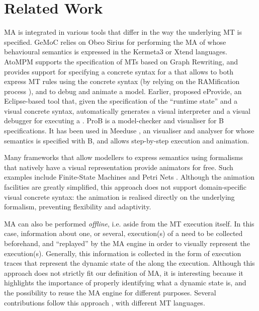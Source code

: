 \section{Related Work}
\label{sec:RW}

MA is integrated in various tools that differ in the way the underlying MT is specified.
GeMoC \citep{combemale2016tool} relies on Obeo Sirius for performing the MA of 
\DSLs whose behavioural semantics is expressed in the Kermeta3 or Xtend languages.
AtoMPM \cite{Syriani-Vangheluwe-etAl:2013} supports the specification of MTs
based on Graph Rewriting, and provides support for specifying a concrete syntax
for a \DSL that allows to both express MT rules using the concrete syntax (by
relying on the RAMification process \cite{Kuehne-Mezei-etAl:2009}), and to 
debug and animate a model. Earlier, \citet{Sadilek-Wachsmuth:2008} proposed eProvide,
an Eclipse-based tool that, given the specification of the ``runtime state''
and a visual concrete syntax, automatically generates a visual interpreter and a 
visual debugger for executing a \DSL. ProB \cite{leuschel2008prob} is a model-checker
and visualiser for B specifications. It has been used in Meeduse \cite{idani2020meeduse},
an visualiser and analyser for \DSLs whose semantics is specified with B, and allows
step-by-step execution and animation.

Many frameworks that allow modellers to express \DSL semantics using formalisms
that natively have a visual representation provide animators for free. Such examples
include Finite-State Machines \cite{Das2016SupportingTM,Goldsby-etAl:2006,Bandener-etAl:2010}
and Petri Nets \cite{mosteller2019integrated,Palanque-etAl:2009,Wimmer-etAl:2009}.
Although the animation facilities are greatly simplified, this approach does
not support domain-specific visual concrete syntax: the animation is realised 
directly on the underlying formalism, preventing flexibility and adaptivity.

MA can also be performed \emph{offline}, i.e. aside from the MT execution itself.
In this case, information about one, or several, execution(s) of a \DSL need to
be collected beforehand, and ``replayed'' by the MA engine in order to visually
represent the execution(s). Generally, this information is collected in the form
of execution traces \cite{J:Hojaji-Mayerhofer-etAl:2019} that represent the dynamic
state of the \DSL along the execution. Although this approach does not strictly 
fit our definition of MA, it is interesting because it highlights the importance
of properly identifying what a dynamic state is, and the possibility to reuse
the MA engine for different purposes. Several contributions follow this approach
\cite{J:Hegedues-Rath-Varro:2012,Guin-Syriani:2013,idani2021formal}, with different
MT languages.

